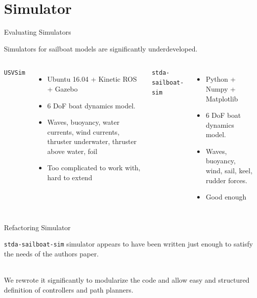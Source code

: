 \documentclass[10pt,xcolor={table,dvipsnames},t]{beamer}
\begin{document}
\section{Simulator}
\begin{frame}{Evaluating Simulators}
    
    
    Simulators for sailboat models are significantly underdeveloped.
    
    \begin{columns}
        \centerline{\texttt{USVSim} \cite{Paravisi2019}}
        \begin{itemize}
            \item Ubuntu 16.04 + Kinetic ROS + Gazebo
            \item 6 DoF boat dynamics model.
            \item Waves, buoyancy, water currents, wind currents, thruster underwater, thruster above water, foil
            \item Too complicated to work with, hard to extend
        \end{itemize}
        \centerline{\texttt{stda-sailboat-sim} \cite{Buehler2018}}
        \begin{itemize}
            \item Python + Numpy + Matplotlib
            \item 6 DoF boat dynamics model.
            \item Waves, buoyancy, wind, sail, keel, rudder forces.
            \item Good enough 
        \end{itemize}
    \end{columns}
    
\end{frame}



\begin{frame}{Refactoring Simulator}

    \texttt{stda-sailboat-sim} simulator appears to have been written just enough to satisfy the needs of the authors paper.
    
    \hfill\\
    We rewrote it significantly to modularize the code and allow easy and structured definition
    of controllers and path planners.

\end{frame}

\end{document}
